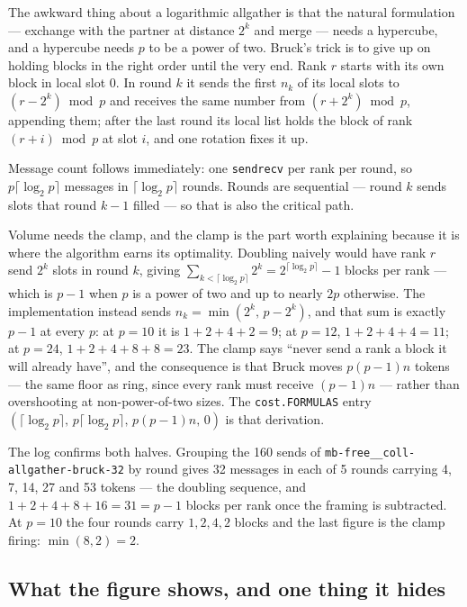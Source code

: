 \documentclass[11pt]{article}
\begin{document}
The awkward thing about a logarithmic allgather is that the natural formulation --- exchange with
the partner at distance $2^k$ and merge --- needs a hypercube, and a hypercube needs $p$ to be a
power of two. Bruck's trick is to give up on holding blocks in the right order until the very end.
Rank $r$ starts with its own block in local slot 0. In round $k$ it sends the first $n_k$ of its
local slots to $(r - 2^k) \bmod p$ and receives the same number from $(r + 2^k) \bmod p$,
appending them; after the last round its local list holds the block of rank $(r+i) \bmod p$ at
slot $i$, and one rotation fixes it up.

Message count follows immediately: one \texttt{sendrecv} per rank per round, so
$p\lceil\log_2 p\rceil$ messages in $\lceil\log_2 p\rceil$ rounds. Rounds are sequential --- round
$k$ sends slots that round $k-1$ filled --- so that is also the critical path.

Volume needs the clamp, and the clamp is the part worth explaining because it is where the
algorithm earns its optimality. Doubling naively would have rank $r$ send $2^k$ slots in round
$k$, giving $\sum_{k<\lceil\log_2 p\rceil} 2^k = 2^{\lceil\log_2 p\rceil} - 1$ blocks per rank ---
which is $p-1$ when $p$ is a power of two and up to nearly $2p$ otherwise. The implementation
instead sends $n_k = \min(2^k,\, p - 2^k)$, and that sum is exactly $p-1$ at every $p$: at $p=10$
it is $1+2+4+2 = 9$; at $p=12$, $1+2+4+4 = 11$; at $p=24$, $1+2+4+8+8 = 23$. The clamp says
``never send a rank a block it will already have'', and the consequence is that Bruck moves
$p(p-1)n$ tokens --- the same floor as ring, since every rank must receive $(p-1)n$ --- rather
than overshooting at non-power-of-two sizes. The \texttt{cost.FORMULAS} entry
$(\lceil\log_2 p\rceil,\, p\lceil\log_2 p\rceil,\, p(p-1)n,\, 0)$ is that derivation.

The log confirms both halves. Grouping the 160 sends of
\texttt{mb-free\_\_coll-allgather-bruck-32} by round gives 32 messages in each of 5 rounds
carrying 4, 7, 14, 27 and 53 tokens --- the doubling sequence, and $1+2+4+8+16 = 31 = p-1$ blocks
per rank once the framing is subtracted. At $p=10$ the four rounds carry $1, 2, 4, 2$ blocks and
the last figure is the clamp firing: $\min(8, 2) = 2$.

\subsection{What the figure shows, and one thing it hides}
\end{document}
